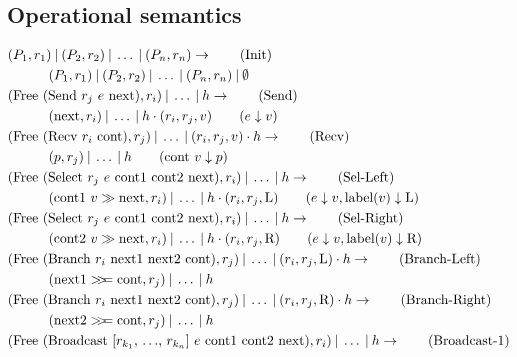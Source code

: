 \subsection{Operational semantics}
\begin{table}[ht]
\begin{align*}
    &(P_1, r_1) \Par (P_2, r_2) \Par \ldots \Par (P_n, r_n) \rightarrow \tag{Init}\\ 
    &\qquad \quad (P_1, r_1) \Par (P_2, r_2) \Par \ldots \Par (P_n, r_n) \Par \emptyset \notag\\ 
    &(\text{Free (Send $r_j$ $e$ next)}, r_i) \Par \ldots \Par h \rightarrow  \tag{Send}\\ 
    &\qquad \quad (\text{next} , r_i) \Par \ldots \Par h \cdot (r_i, r_j, v) \qquad (e \downarrow v) \notag\\ 
    &(\text{Free (Recv $r_i$ cont)}, r_j) \Par \ldots \Par (r_i, r_j, v) \cdot h \rightarrow  \tag{Recv}\\ 
    &\qquad \quad (p, r_j) \Par \ldots \Par h \qquad (\text{cont $v$} \downarrow p)\notag\\ 
    &(\text{Free (Select $r_j$ $e$ cont1 cont2 next)}, r_i) \Par \ldots \Par h \rightarrow  \tag{Sel-Left}\\ 
    &\qquad \quad (\text{cont1 $v$} \gg \text{next}, r_i) \Par \ldots \Par h \cdot (r_i, r_j, \text{L}) \qquad (e \downarrow v, \text{label}(v) \downarrow \text{L}) \notag\\ 
    &(\text{Free (Select $r_j$ $e$ cont1 cont2 next)}, r_i) \Par \ldots \Par h \rightarrow  \tag{Sel-Right}\\ 
    &\qquad \quad (\text{cont2 $v$} \gg \text{next}, r_i) \Par \ldots \Par h \cdot (r_i, r_j, \text{R}) \qquad (e \downarrow v, \text{label}(v) \downarrow \text{R}) \notag\\ 
    &(\text{Free (Branch $r_i$ next1 next2 cont)}, r_j) \Par \ldots \Par (r_i, r_j, \text{L}) \cdot h \rightarrow  \tag{Branch-Left}\\ 
    &\qquad \quad (\text{next1} >\!\!>\!\!= \text{cont}, r_j) \Par \ldots \Par h \notag\\ 
    &(\text{Free (Branch $r_i$ next1 next2 cont)}, r_j) \Par \ldots \Par (r_i, r_j, \text{R}) \cdot h \rightarrow  \tag{Branch-Right}\\ 
    &\qquad \quad (\text{next2} >\!\!>\!\!= \text{cont}, r_j) \Par \ldots \Par h \notag\\ 
    &(\text{Free (Broadcast [$r_{k_1}$, $\ldots$, $r_{k_n}$] $e$ cont1 cont2 next)}, r_i) \Par \ldots \Par h \rightarrow  \tag{Broadcast-1}\\ 

\end{align*}
\end{table}
